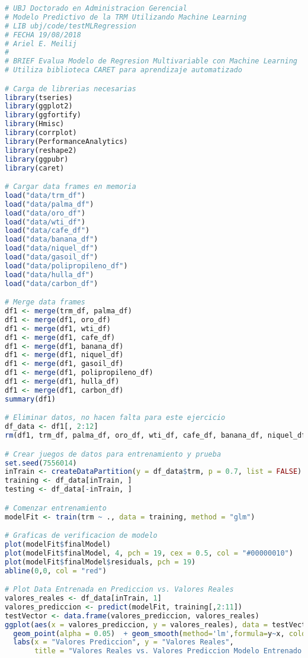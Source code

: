 \begin{lstlisting}[language=R]
# UBJ Doctorado en Administracion Gerencial
# Modelo Predictivo de la TRM Utilizando Machine Learning
# LIB ubj/code/testMLRegression
# FECHA 19/08/2018
# Ariel E. Meilij
#
# BRIEF Evalua Modelo de Regresion Multivariable con Machine Learning
# Utiliza biblioteca CARET para aprendizaje automatizado

# Carga de librerias necesarias
library(tseries)
library(ggplot2)
library(ggfortify)
library(Hmisc)
library(corrplot)
library(PerformanceAnalytics)
library(reshape2)
library(ggpubr)
library(caret)

# Cargar data frames en memoria
load("data/trm_df")
load("data/palma_df")
load("data/oro_df")
load("data/wti_df")
load("data/cafe_df")
load("data/banana_df")
load("data/niquel_df")
load("data/gasoil_df")
load("data/polipropileno_df")
load("data/hulla_df")
load("data/carbon_df")

# Merge data frames
df1 <- merge(trm_df, palma_df)
df1 <- merge(df1, oro_df)
df1 <- merge(df1, wti_df)
df1 <- merge(df1, cafe_df)
df1 <- merge(df1, banana_df)
df1 <- merge(df1, niquel_df)
df1 <- merge(df1, gasoil_df)
df1 <- merge(df1, polipropileno_df)
df1 <- merge(df1, hulla_df)
df1 <- merge(df1, carbon_df)
summary(df1)

# Eliminar datos, no hacen falta para este ejercicio
df_data <- df1[, 2:12]
rm(df1, trm_df, palma_df, oro_df, wti_df, cafe_df, banana_df, niquel_df, gasoil_df, polipropileno_df, hulla_df, carbon_df)

# Crear juegos de datos para entrenamiento y prueba
set.seed(7556014)
inTrain <- createDataPartition(y = df_data$trm, p = 0.7, list = FALSE)
training <- df_data[inTrain, ]
testing <- df_data[-inTrain, ]

# Comenzar entrenamiento
modelFit <- train(trm ~ ., data = training, method = "glm")

# Graficas de verificacion de modelo
plot(modelFit$finalModel)
plot(modelFit$finalModel, 4, pch = 19, cex = 0.5, col = "#00000010")
plot(modelFit$finalModel$residuals, pch = 19)
abline(0,0, col = "red")

# Plot Data Entrenada en Prediccion vs. Valores Reales
valores_reales <- df_data[inTrain, 1]
valores_prediccion <- predict(modelFit, training[,2:11])
testVector <- data.frame(valores_prediccion, valores_reales)
ggplot(aes(x = valores_prediccion, y = valores_reales), data = testVector) +
  geom_point(alpha = 0.05)  + geom_smooth(method='lm',formula=y~x, colour = "green") +
  labs(x = "Valores Prediccion", y = "Valores Reales",
       title = "Valores Reales vs. Valores Prediccion Modelo Entrenado Regresion Multivariable")


\end{lstlisting}
